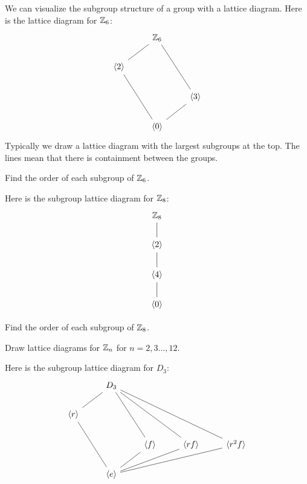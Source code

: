 \documentclass{ximera}
\begin{document}
\begin{example}
  We can visualize the subgroup structure of a group with a lattice
  diagram. Here is the lattice diagram for $\mathbb Z_6$:
  \[
   \begin{tikzcd}
    & \Z_6 \ar[ld,-]  \ar[rdd,-] &       \\
    \<2\> \ar[rdd,-] &  &\\
   & &  \< 3\> \ar[ld,-]        \\   
    & \<0\> &
   \end{tikzcd}
   \]
  Typically we draw a lattice diagram with the largest subgroups at
  the top. The lines mean that there is containment between the groups.
\end{example}

\begin{exercise}
  Find the order of each subgroup of $\mathbb Z_6$.
\end{exercise}

\begin{example}
  Here is the subgroup lattice diagram for $\mathbb Z_8$:
  \[
  \begin{tikzcd}
    \Z_8  \ar[d,-] \\
    \<2\> \ar[d,-] \\
    \<4\> \ar[d,-] \\   
    \<0\> 
  \end{tikzcd}
  \]
\end{example}

\begin{exercise}
  Find the order of each subgroup of $\mathbb Z_8$.
\end{exercise}

\begin{exercise}
  Draw lattice diagrams for $\mathbb Z_n$ for $n=2,3\dots, 12$.
\end{exercise}




\begin{example}
  Here is the subgroup lattice diagram for $D_3$:
  \[
  \begin{tikzcd}
    & D_3 \ar[rdd,-]\ar[rrdd,-]\ar[rrrdd,-]  \ar[ld,-] & & &      \\
    \<r\> \ar[rdd,-]       &       &  & &  \\
    &       &  \< f\> \ar[ld,-]   &  \< rf\> \ar[lld,-]       &  \< r^2f\> \ar[llld,-]        \\   
    & \<e\> & & &
  \end{tikzcd}
  \]
\end{example}
\end{document}
